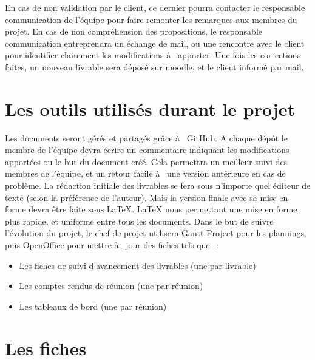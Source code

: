     En cas de non validation par le client, ce dernier pourra contacter le responsable communication de l'équipe pour faire remonter les remarques aux membres du projet. En cas de non compréhension des propositions, le responsable communication entreprendra un échange de mail, ou une rencontre avec le client pour identifier clairement les modifications à  apporter.
    Une fois les corrections faites, un nouveau livrable sera déposé sur moodle, et le client informé par mail.

\section{Les outils utilisés durant le projet}
    Les documents seront gérés et partagés grâce à  GitHub. A chaque dépôt le membre de l'équipe devra écrire un commentaire indiquant les modifications apportées ou le but du document créé. Cela permettra un meilleur suivi des membres de l'équipe, et un retour facile à  une version antérieure en cas de problème.
    La rédaction initiale des livrables se fera sous n'importe quel éditeur de texte (selon la préférence de l'auteur). Mais la version finale avec sa mise en forme devra être faite sous LaTeX. LaTeX nous permettant une mise en forme plus rapide, et uniforme entre tous les documents.
Dans le but de suivre l'évolution du projet, le chef de projet utilisera Gantt Project pour les plannings, puis OpenOffice pour mettre à  jour des fiches tels que  :
\begin{itemize}
    \item Les fiches de suivi d'avancement des livrables (une par livrable)
    \item Les comptes rendus de réunion (une par réunion)
    \item Les tableaux de bord (une par réunion)
\end{itemize}

\pagebreak
\section{Les fiches}
